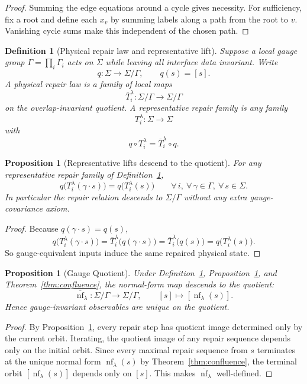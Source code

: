 \documentclass[11pt]{article}
\newtheorem{proposition}[theorem]{Proposition}
\newtheorem{definition}[theorem]{Definition}
\newcommand{\nf}{\operatorname{nf}}
\begin{document}
\begin{proof}
Summing the edge equations around a cycle gives necessity. For sufficiency, fix a root and define each $x_v$ by summing labels along a path from the root to $v$. Vanishing cycle sums make this independent of the chosen path.
\end{proof}

\begin{definition}[Physical repair law and representative lift]\label{def:physicalrepair}
Suppose a local gauge group $\Gamma=\prod_i \Gamma_i$ acts on $\Sigma$ while leaving all interface
data invariant. Write
\[
q:\Sigma\to\Sigma/\Gamma,
\qquad
q(s)=[s].
\]
A physical repair law is a family of local maps
\[
\overline T_i^\lambda:\Sigma/\Gamma\to\Sigma/\Gamma
\]
on the overlap-invariant quotient. A representative repair family is any family
\[
T_i^\lambda:\Sigma\to\Sigma
\]
with
\[
q\circ T_i^\lambda=\overline T_i^\lambda\circ q.
\]
\end{definition}

\begin{proposition}[Representative lifts descend to the quotient]\label{prop:repairquot}
For any representative repair family of Definition~\ref{def:physicalrepair},
\[
q\bigl(T_i^\lambda(\gamma\cdot s)\bigr)=q\bigl(T_i^\lambda(s)\bigr)
\qquad
\forall\, i,\ \forall\, \gamma\in\Gamma,\ \forall\, s\in\Sigma.
\]
In particular the repair relation descends to \(\Sigma/\Gamma\) without any extra
gauge-covariance axiom.
\end{proposition}

\begin{proof}
Because \(q(\gamma\cdot s)=q(s)\),
\[
q\bigl(T_i^\lambda(\gamma\cdot s)\bigr)
=
\overline T_i^\lambda\bigl(q(\gamma\cdot s)\bigr)
=
\overline T_i^\lambda\bigl(q(s)\bigr)
=
q\bigl(T_i^\lambda(s)\bigr).
\]
So gauge-equivalent inputs induce the same repaired physical state.
\end{proof}

\begin{proposition}[Gauge Quotient]\label{prop:gauge}
Under Definition~\ref{def:physicalrepair}, Proposition~\ref{prop:repairquot}, and
Theorem~\ref{thm:confluence}, the normal-form map descends to the quotient:
\[
\overline{\nf}_\lambda:\Sigma/\Gamma\to\Sigma/\Gamma,
\qquad
[s]\mapsto [\nf_\lambda(s)].
\]
Hence gauge-invariant observables are unique on the quotient.
\end{proposition}

\begin{proof}
By Proposition~\ref{prop:repairquot}, every repair step has quotient image determined only by the
current orbit. Iterating, the quotient image of any repair sequence depends only on the initial
orbit. Since every maximal repair sequence from \(s\) terminates at the unique normal form
\(\nf_\lambda(s)\) by Theorem~\ref{thm:confluence}, the terminal orbit \([\nf_\lambda(s)]\)
depends only on \([s]\). This makes \(\overline{\nf}_\lambda\) well-defined.
\end{proof}
\end{document}

